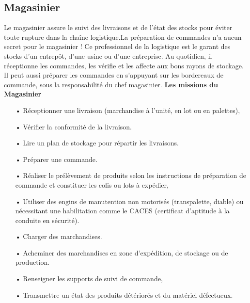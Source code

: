 \documentclass[edit,12pt,a4paper,ChapStyle,oneside,doubleinterligne]{report}
\begin{document}
\subsection{Magasinier}
Le magasinier assure le suivi des livraisons et de l’état des stocks pour éviter toute rupture dans la chaîne logistique.La préparation de commandes n’a aucun secret pour le magasinier ! Ce professionnel de la logistique est le garant des stocks d’un entrepôt, d’une usine ou d’une entreprise. Au quotidien, il réceptionne les commandes, les vérifie et les affecte aux bons rayons de stockage. Il peut aussi préparer les commandes en s’appuyant sur les bordereaux de commande, sous la responsabilité du chef magasinier.
\cite{Magasinier}\newline
\textbf{Les missions du Magasinier}\newline
\begin{itemize}
    \item [•]Réceptionner une livraison (marchandise à l’unité, en lot ou en palettes),
    \item [•] Vérifier la conformité de la livraison.
    \item [•] Lire un plan de stockage pour répartir les livraisons.
    \item [•] Préparer une commande.
    \item [•] Réaliser le prélèvement de produits selon les instructions de préparation de commande et constituer les colis ou lots à expédier,
    \item [•] Utiliser des engins de manutention non motorisés (transpalette, diable) ou nécessitant une habilitation comme le CACES (certificat d’aptitude à la conduite en sécurité).
    \item [•] Charger des marchandises.
    \item [•] Acheminer des marchandises en zone d'expédition, de stockage ou de production.
    \item [•] Renseigner les supports de suivi de commande,
    \item [•] Transmettre un état des produits détériorés et du matériel défectueux.
\end{itemize}
\end{document}
